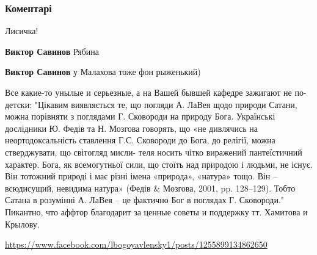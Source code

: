  
 
 
 
 
\subsubsection{Коментарі}

\begin{itemize} %
Лисичка!

\begin{itemize} %
\textbf{Виктор Савинов} Рябина

\textbf{Виктор Савинов} у Малахова тоже фон рыженький)
\end{itemize} %


Все какие-то унылые и серьезные, а на Вашей бывшей кафедре зажигают не
по-детски: "Цікавим виявляється те, що погляди А. ЛаВея щодо природи Сатани,
можна порівняти з поглядами Г. Сковороди на природу Бога. Українські дослідники
Ю. Федів та Н. Мозгова говорять, що «не дивлячись на неортодоксальність
ставлення Г.С. Сковороди до Бога, до релігії, можна стверджувати, що світогляд
мисли- теля носить чітко виражений пантеїстичний характер. Бога, як
всемогутньої сили, що стоїть над природою і людьми, не існує. Він тотожний
природі і має різні імена «природа», «натура» тощо. Він – всюдисущий, невидима
натура» (Федів \& Мозгова, 2001, pp. 128–129). Тобто Сатана в розумінні А. ЛаВея
– це фактично Бог в поглядах Г. Сковороди." Пикантно, что аффтор благодарит за
ценные советы и поддержку тт. Хамитова и Крылову. 

\url{https://www.facebook.com/lbogoyavlensky1/posts/1255899134862650}

\end{itemize} %
